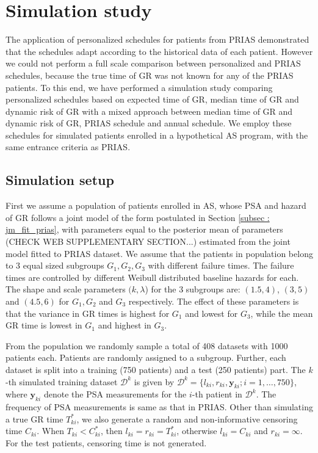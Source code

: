 
\section{Simulation study}
\label{sec: simulation_study}
The application of personalized schedules for patients from PRIAS demonstrated that the schedules adapt according to the historical data of each patient. However we could not perform a full scale comparison between personalized and PRIAS schedules, because the true time of GR was not known for any of the PRIAS patients. To this end, we have performed a simulation study comparing personalized schedules based on expected time of GR, median time of GR and dynamic risk of GR with a mixed approach between median time of GR and dynamic risk of GR, PRIAS schedule and annual schedule. We employ these schedules for simulated patients enrolled in a hypothetical AS program, with the same entrance criteria as PRIAS.

\subsection{Simulation setup}
\label{subsec : simulation_setup}
First we assume a population of patients enrolled in AS, whose PSA and hazard of GR follows a joint model of the form postulated in Section \ref{subsec : jm_fit_prias}, with parameters equal to the posterior mean of parameters (CHECK WEB SUPPLEMENTARY SECTION...) estimated from the joint model fitted to PRIAS dataset. We assume that the patients in population belong to 3 equal sized subgroups $G_1, G_2, G_3$ with different failure times. The failure times are controlled by different Weibull distributed baseline hazards for each. The shape and scale parameters $(k, \lambda$) for the 3 subgroups are: $(1.5, 4)$, $(3, 5)$ and $(4.5, 6)$ for $G_1, G_2$ and $G_3$ respectively. The effect of these parameters is that the variance in GR times is highest for $G_1$ and lowest for $G_3$, while the mean GR time is lowest in $G_1$ and highest in $G_3$.

From the population we randomly sample a total of 408 datasets with 1000 patients each. Patients are randomly assigned to a subgroup. Further, each dataset is split into a training (750 patients) and a test (250 patients) part. The $k$-th simulated training dataset $\mathcal{D}^k$ is given by $\mathcal{D}^k = \{l_{ki}, r_{ki}, \boldsymbol{y}_{ki}; i = 1, \ldots, 750\}$, where $\boldsymbol{y}_{ki}$ denote the PSA measurements for the $i$-th patient in $\mathcal{D}^k$. The frequency of PSA measurements is same as that in PRIAS. Other than simulating a true GR time $T^*_{ki}$, we also generate a random and non-informative censoring time $C_{ki}$. When $T_{ki} < C^*_{ki}$, then $l_{ki} = r_{ki} = T^*_{ki}$, otherwise $l_{ki} = C_{ki}$ and $r_{ki} = \infty$. For the test patients, censoring time is not generated.

